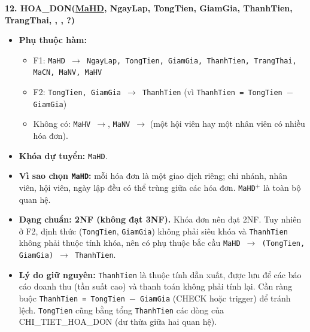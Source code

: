 \documentclass[11pt, a4paper]{article}
\newcommand{\pk}[1]{\bgroup\ULdepth=1.8pt\uline{#1}\egroup}
\newcommand{\fk}[1]{\bgroup\ULdepth=1.8pt\dashuline{#1}\egroup}
\begin{document}
\textbf{12. HOA\_DON(\pk{MaHD}, NgayLap, TongTien, GiamGia, ThanhTien, TrangThai, \fk{MaCN}, \fk{MaNV}, \fk{MaHV}?)}
\begin{itemize}
    \item \textbf{Phụ thuộc hàm:}
    \begin{itemize}
        \item F1: \texttt{MaHD $\rightarrow$ NgayLap, TongTien, GiamGia, ThanhTien, TrangThai, MaCN, MaNV, MaHV}
        \item F2: \texttt{TongTien, GiamGia $\rightarrow$ ThanhTien} (vì \texttt{ThanhTien = TongTien $-$ GiamGia})
        \item Không có: \texttt{MaHV $\rightarrow$}, \texttt{MaNV $\rightarrow$} (một hội viên hay một nhân viên có nhiều hóa đơn).
    \end{itemize}
    \item \textbf{Khóa dự tuyển:} \texttt{MaHD}.
    \item \textbf{Vì sao chọn \texttt{MaHD}:} mỗi hóa đơn là một giao dịch riêng; chi nhánh, nhân viên, hội viên, ngày lập đều có thể trùng giữa các hóa đơn. \texttt{MaHD$^+$} là toàn bộ quan hệ.
    \item \textbf{Dạng chuẩn: 2NF (không đạt 3NF).} Khóa đơn nên đạt 2NF. Tuy nhiên ở F2, định thức (\texttt{TongTien}, \texttt{GiamGia}) không phải siêu khóa và \texttt{ThanhTien} không phải thuộc tính khóa, nên có phụ thuộc bắc cầu \texttt{MaHD $\rightarrow$ (TongTien, GiamGia) $\rightarrow$ ThanhTien}.
    \item \textbf{Lý do giữ nguyên:} \texttt{ThanhTien} là thuộc tính dẫn xuất, được lưu để các báo cáo doanh thu (tần suất cao) và thanh toán không phải tính lại. Cần ràng buộc \texttt{ThanhTien = TongTien $-$ GiamGia} (CHECK hoặc trigger) để tránh lệch. \texttt{TongTien} cũng bằng tổng \texttt{ThanhTien} các dòng của CHI\_TIET\_HOA\_DON (dư thừa giữa hai quan hệ).
\end{itemize}
\end{document}
